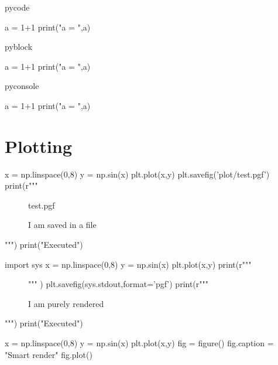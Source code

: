 \documentclass[a4paper]{article}
\begin{document}
pycode
\begin{pycode}
a = 1+1
print("a = ",a)
\end{pycode}

pyblock
\begin{pyblock}
a = 1+1
print("a = ",a)
\end{pyblock}

pyconsole
\begin{pyconsole}
a = 1+1
print("a = ",a)
\end{pyconsole}

\section{Plotting}%
\label{sec:plotting}



\begin{pycode}
x = np.linspace(0,8)
y = np.sin(x)
plt.plot(x,y)
plt.savefig('plot/test.pgf')
print(r"""
\begin{figure}[ht]
	\centering
	{test.pgf}
	\caption{I am saved in a file}
\end{figure} """)
print("Executed")
\end{pycode}

\begin{pycode}
import sys
x = np.linspace(0,8)
y = np.sin(x)
plt.plot(x,y)
print(r"""
\begin{figure}[ht]
	\centering""" )
plt.savefig(sys.stdout,format='pgf')
print(r"""
\caption{I am purely rendered}
\end{figure} """)
print("Executed")
\end{pycode}

\begin{pycode}
x = np.linspace(0,8)
y = np.sin(x)
plt.plot(x,y)
fig = figure()
fig.caption = "Smart render"
fig.plot()
	
\end{pycode}
\end{document}
